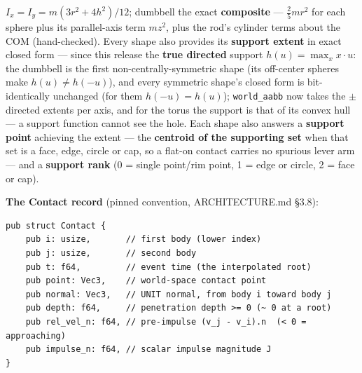 \documentclass[11pt]{article}
\newcommand{\code}[1]{\texttt{#1}}
\begin{document}
$I_x = I_y = m(3r^2 + 4h^2)/12$; dumbbell the exact \textbf{composite} ---
$\tfrac25 m r^2$ for each sphere plus its parallel-axis term $m z^2$, plus
the rod's cylinder terms about the COM (hand-checked). Every shape also
provides its \textbf{support extent} in exact closed form --- since this
release the \textbf{true directed} support $h(u) = \max_{x} x \cdot u$: the
dumbbell is the first non-centrally-symmetric shape (its off-center spheres
make $h(u) \ne h(-u)$), and every symmetric shape's closed form is
bit-identically unchanged (for them $h(-u) = h(u)$);
\code{world\_aabb} now takes the $\pm$ directed extents per axis, and for
the torus the support is that of its convex hull --- a support function
cannot see the hole. Each shape also answers a \textbf{support point}
achieving the extent --- the \textbf{centroid of the supporting set} when
that set is a face, edge, circle or cap, so a flat-on contact carries no
spurious lever arm --- and a \textbf{support rank} (0 = single point/rim
point, 1 = edge or circle, 2 = face or cap).

\textbf{The Contact record} (pinned convention, ARCHITECTURE.md \S 3.8):

\begin{lstlisting}
pub struct Contact {
    pub i: usize,       // first body (lower index)
    pub j: usize,       // second body
    pub t: f64,         // event time (the interpolated root)
    pub point: Vec3,    // world-space contact point
    pub normal: Vec3,   // UNIT normal, from body i toward body j
    pub depth: f64,     // penetration depth >= 0 (~ 0 at a root)
    pub rel_vel_n: f64, // pre-impulse (v_j - v_i).n  (< 0 = approaching)
    pub impulse_n: f64, // scalar impulse magnitude J
}
\end{lstlisting}
\end{document}
